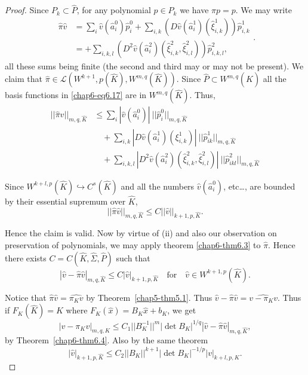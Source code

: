 \begin{proof}
Since $P_{k}\subset \hat{P}$, for any polynomial $p\in P_{k}$ we have
$\hat{\pi}p=p$. We may write
\begin{equation*}
\begin{split}
\hat{\pi}\hat{v} &=
\sum_{i}\hat{v}(\hat{a}^{0}_{i})\hat{p}^{0}_{i}+\sum_{i,k}(D\hat{v}(\hat{a}^{1}_{i})(\hat{\xi}^{1}_{i,k}))\hat{p}^{1}_{i,k}\\
&= +\sum_{i,k,l}(D^{2}\hat{v}(\hat{a}^{2}_{i})(\hat{\xi}^{2}_{i,k},\hat{\xi}^{2}_{i,l}))\hat{p}^{2}_{i,k,l},
\end{split}.\tag{6.17}\label{chap6-eq6.17} 
\end{equation*}
all these sums being finite (the second and third may or may not be
present).
We claim that $\hat{\pi}\in\mathscr{L}(W^{k+1},
p(\hat{K}),W^{m,q}(\hat{K}))$. Since $\hat{P}\subset W^{m,q}(\hat{K})$
all the basis functions in \eqref{chap6-eq6.17} are in
$W^{m,q}(\hat{K})$. Thus,
\begin{equation*}
\begin{split}
||\hat{\pi}\hat{v}||_{m,q,\hat{K}} &\leq
\sum_{i}|\hat{v}(\hat{a}^{0}_{i})|~||\hat{p}^{0}_{i}||_{m,q,\hat{K}}\\
&\quad
+\sum_{i,k}|D\hat{v}(\hat{a}^{1}_{i})(\xi^{1}_{i,k})|~||\hat{p}^{1}_{ik}||_{m,q,\hat{K}}\\
&\quad +\sum_{i,k,l}|D^{2}\hat{v}(\hat{a}^{2}_{i})(\hat{\xi}^{2}_{i,k},\hat{\xi}^{2}_{i,l})|~||\hat{p}^{2}_{ikl}||_{m,q,\hat{K}}
\end{split}\tag{6.18}\label{chap6-eq6.18}
\end{equation*}

Since $W^{k+l,p}(\hat{K})\hookrightarrow C^{s}(\hat{K})$ and all the
numbers $\hat{v}(\hat{a}^{0}_{i})$, etc\ldots, are bounded by their
essential supremum over $\hat{K}$, 
$$
||\hat{\pi}\hat{v}||_{m,q,\hat{K}}\leq C||\hat{v}||_{k+1,p,\hat{K}}.
$$\pageoriginale

Hence the claim is valid. Now by virtue of (ii) and also our
observation on preservation of polynomials, we may apply theorem
\ref{chap6-thm6.3} to $\hat{\pi}$. Hence there exists
$C=C(\hat{K},\hat{\Sigma},\hat{P})$ such that
$$
|\hat{v}-\hat{\pi}\hat{v}|_{m,q,\hat{K}}\leq
C|\hat{v}|_{k+1,p,\hat{K}}\quad\text{for}\quad \hat{v}\in
W^{k+1,p}(\hat{K}). 
$$

Notice that $\hat{\pi}\hat{v}=\widehat{\pi_{K}v}$ by
Theorem~\ref{chap5-thm5.1}. Thus
$\hat{v}-\hat{\pi}\hat{v}=\widehat{v-\pi_{K}v}$. Thus if
$F_{K}(\hat{K})=K$ where $F_{K}(\hat{x})=B_{K}\hat{x}+b_{K}$, we get
\begin{equation*}
|v-\pi_{K}v|_{m,q,K}\leq C_{1}||B^{-1}_{K}||^{m}|\det
B_{K}|^{1/q}|\hat{v}-\hat{\pi}\hat{v}|_{m,q,\hat{K}},\tag{6.19}\label{chap6-eq6.19} 
\end{equation*}
by Theorem~\ref{chap6-thm6.4}. Also by the same theorem
\begin{equation*}
|\hat{v}|_{k+1,p,\hat{K}}\leq C_{2}||B_{K}||^{k+1}|\det
B_{K}|^{-1/p}|v|_{k+l,p,K}.\tag{6.20}\label{chap6-eq6.20} 
\end{equation*}


\end{proof}
